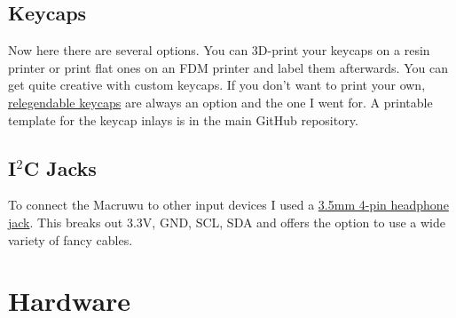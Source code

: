 \documentclass[english, 12pt]{scrartcl}
\begin{document}
	\subsection{Keycaps}
	Now here there are several options. You can 3D-print your keycaps on a resin printer or print flat ones on an FDM printer and label them afterwards. You can get quite creative with custom keycaps. If you don't want to print your own, \href{https://de.aliexpress.com/item/1005003047698548.html}{relegendable keycaps} are always an option and the one I went for. A printable template for the keycap inlays is in the main GitHub repository.
	
	\subsection{I$^2$C Jacks}
	To connect the Macruwu to other input devices I used a \href{https://keycapsss.com/keyboard-parts/parts/54/2x-trrs-jacks-3.5mm?c=11}{3.5mm 4-pin headphone jack}. This breaks out 3.3V, GND, SCL, SDA and offers the option to use a wide variety of fancy cables.
	\newpage
	\section{Hardware}
	
\end{document}
